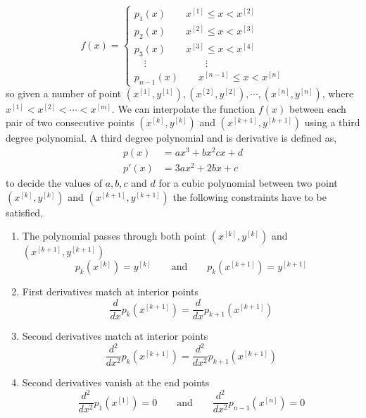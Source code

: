 \documentclass[11pt]{article}
\begin{document}
\begin{equation}
    f(x) = 
    \begin{cases}
    p_{1}(x) \qquad x^{[1]} \leq x < x^{[2]} \\
    p_{2}(x) \qquad x^{[2]} \leq x < x^{[3]} \\
    p_{3}(x) \qquad x^{[3]} \leq x < x^{[4]} \\
    \quad    \vdots \qquad \qquad \qquad \vdots \\
    p_{n - 1}(x) \qquad x^{[n - 1]} \leq x < x^{[n]}
    \end{cases}
\end{equation}
so given a number of point $(x^{[1]}, y^{[1]}), (x^{[2]}, y^{[2]}), \cdots , (x^{[n]}, y^{[n]})$, where $x^{[1]} < x^{[2]} < \cdots < x^{[m]}$. We can interpolate the function $f(x)$ between each pair of two consecutive points $(x^{[k]}, y^{[k]})$ and $(x^{[k + 1]}, y^{[k + 1]})$  using a third degree polynomial. A third degree polynomial and is derivative is defined as,
\begin{equation}
\begin{split}
    p(x) &= ax^{3} + bx^{2} cx + d \\
    p'(x) &= 3ax^{2} + 2bx + c
\end{split}
\end{equation}
to decide the values of $a, b, c$ and $d$ for a cubic polynomial between two point $(x^{[k]}, y^{[k]})$ and $(x^{[k+1]}, y^{[k+1]})$ the following constraints have to be satisfied,
\begin{enumerate}
    \item The polynomial passes through both point $(x^{[k]}, y^{[k]})$ and $(x^{[k+1]}, y^{[k+1]})$
    \begin{equation}
        p_{k}(x^{[k]}) = y^{[k]} \qquad \text{and} \qquad p_{k}(x^{[k + 1]}) = y^{[k + 1]}
    \end{equation}
    \item First derivatives match at interior points
    \begin{equation}
        \frac{d}{dx} p_{k}(x^{[k + 1]}) = \frac{d}{dx} p_{k + 1}(x^{[k + 1]})
    \end{equation}
    \item Second derivatives match at interior points
    \begin{equation}
        \frac{d^{2}}{dx^{2}} p_{k}(x^{[k + 1]}) = \frac{d^{2}}{dx^{2}} p_{k + 1}(x^{[k + 1]})
    \end{equation}
    \item Second derivatives vanish at the end points
    \begin{equation}
        \frac{d^{2}}{dx^{2}} p_{1}(x^{[1]}) = 0 \qquad \text{and} \qquad \frac{d^{2}}{dx^{2}} p_{n - 1}(x^{[n]}) = 0
    \end{equation}
\end{enumerate}
\end{document}

